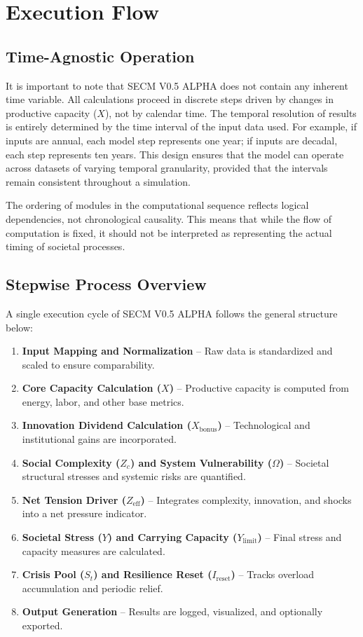 \documentclass[12pt,a4paper]{article}
\begin{document}
\section{Execution Flow}

\subsection{Time-Agnostic Operation}
It is important to note that SECM V0.5 ALPHA does not contain any inherent time variable. All calculations proceed in discrete steps driven by changes in productive capacity (\(X\)), not by calendar time. The temporal resolution of results is entirely determined by the time interval of the input data used. For example, if inputs are annual, each model step represents one year; if inputs are decadal, each step represents ten years. This design ensures that the model can operate across datasets of varying temporal granularity, provided that the intervals remain consistent throughout a simulation.

The ordering of modules in the computational sequence reflects logical dependencies, not chronological causality. This means that while the flow of computation is fixed, it should not be interpreted as representing the actual timing of societal processes.

\subsection{Stepwise Process Overview}
A single execution cycle of SECM V0.5 ALPHA follows the general structure below:
\begin{enumerate}
    \item \textbf{Input Mapping and Normalization} – Raw data is standardized and scaled to ensure comparability.
    \item \textbf{Core Capacity Calculation (\(X\))} – Productive capacity is computed from energy, labor, and other base metrics.
    \item \textbf{Innovation Dividend Calculation (\(X_{\text{bonus}}\))} – Technological and institutional gains are incorporated.
    \item \textbf{Social Complexity (\(Z_c\)) and System Vulnerability (\(\Omega\))} – Societal structural stresses and systemic risks are quantified.
    \item \textbf{Net Tension Driver (\(Z_{\mathrm{eff}}\))} – Integrates complexity, innovation, and shocks into a net pressure indicator.
    \item \textbf{Societal Stress (\(Y\)) and Carrying Capacity (\(Y_{\mathrm{limit}}\))} – Final stress and capacity measures are calculated.
    \item \textbf{Crisis Pool (\(S_t\)) and Resilience Reset (\(I_{\mathrm{reset}}\))} – Tracks overload accumulation and periodic relief.
    \item \textbf{Output Generation} – Results are logged, visualized, and optionally exported.
\end{enumerate}
\end{document}
